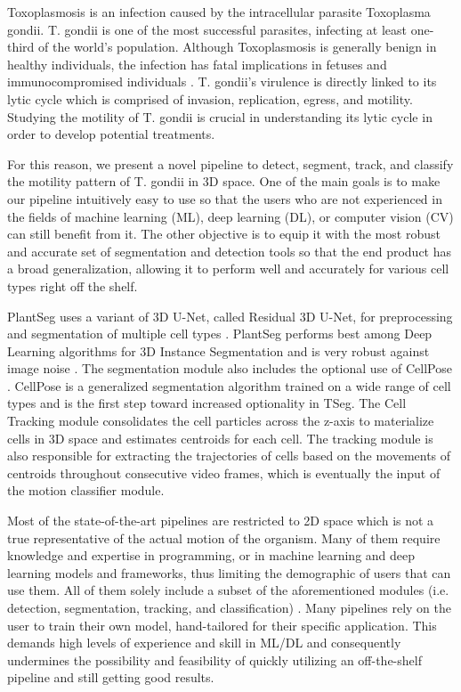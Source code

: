 \documentclass[./dissertation.tex]{subfiles}
\begin{document}
Toxoplasmosis is an infection caused by the intracellular parasite Toxoplasma gondii. T. gondii is one of the most successful parasites, infecting at least one-third of the world's population. Although Toxoplasmosis is generally benign in healthy individuals, the infection has fatal implications in fetuses and immunocompromised individuals \cite{saadatnia2012review}. T. gondii's virulence is directly linked to its lytic cycle which is comprised of invasion, replication, egress, and motility. Studying the motility of T. gondii is crucial in understanding its lytic cycle in order to develop potential treatments.

For this reason, we present a novel pipeline to detect, segment, track, and classify the motility pattern of T. gondii in 3D space. One of the main goals is to make our pipeline intuitively easy to use so that the users who are not experienced in the fields of machine learning (ML), deep learning (DL), or computer vision (CV) can still benefit from it. The other objective is to equip it with the most robust and accurate set of segmentation and detection tools so that the end product has a broad generalization, allowing it to perform well and accurately for various cell types right off the shelf.

PlantSeg uses a variant of 3D U-Net, called Residual 3D U-Net, for preprocessing and segmentation of multiple cell types \cite{plantseg}. PlantSeg performs best among Deep Learning algorithms for 3D Instance Segmentation and is very robust against image noise \cite{Kar2021.06.09.447748}. The segmentation module also includes the optional use of CellPose \cite{stringer2021cellpose}. CellPose is a generalized segmentation algorithm trained on a wide range of cell types and is the first step toward increased optionality in TSeg. The Cell Tracking module consolidates the cell particles across the z-axis to materialize cells in 3D space and estimates centroids for each cell. The tracking module is also responsible for extracting the trajectories of cells based on the movements of centroids throughout consecutive video frames, which is eventually the input of the motion classifier module.

Most of the state-of-the-art pipelines are restricted to 2D space which is not a true representative of the actual motion of the organism. Many of them require knowledge and expertise in programming, or in machine learning and deep learning models and frameworks, thus limiting the demographic of users that can use them. All of them solely include a subset of the aforementioned modules (i.e. detection, segmentation, tracking, and classification) \cite{stringer2021cellpose}. Many pipelines rely on the user to train their own model, hand-tailored for their specific application. This demands high levels of experience and skill in ML/DL and consequently undermines the possibility and feasibility of quickly utilizing an off-the-shelf pipeline and still getting good results.
\end{document}
